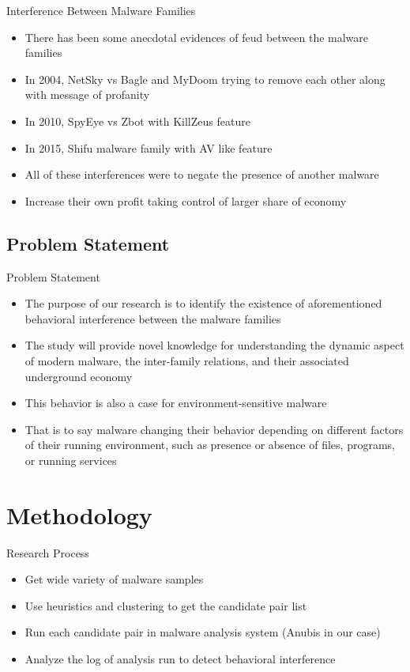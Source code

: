 \documentclass[]{beamer}
\begin{document}
\begin{frame}[t]{Interference Between Malware Families}
  \begin{itemize}
    \item There has been some anecdotal evidences of feud between the malware families
    \item In 2004, NetSky vs Bagle and MyDoom trying to remove each other along with message of profanity
    \item In 2010, SpyEye vs Zbot with KillZeus feature
    \item In 2015, Shifu malware family with AV like feature
    \item All of these interferences were to negate the presence of another malware
    \item Increase their own profit taking control of larger share of economy
  \end{itemize}
\end{frame}
\subsection{Problem Statement}
\label{sub:Problem Statement}
\begin{frame}[t]{Problem Statement}
\begin{itemize}
  \item The purpose of our research is to identify the existence of aforementioned behavioral interference between the malware families
  \item The study will provide novel knowledge for understanding the dynamic aspect of modern malware, the inter-family relations, and their associated underground economy
  \item This behavior is also a case for environment-sensitive malware
  \item That is to say malware changing their behavior depending on different factors of their running environment, such as presence or absence of files, programs, or running services
\end{itemize}
\end{frame}

\section{Methodology}
\label{sec:Methodology}
\begin{frame}[t]{Research Process}
\begin{itemize}
\item Get wide variety of malware samples
\item Use heuristics and clustering to get the candidate pair list
\item Run each candidate pair in malware analysis system (Anubis in our case)
\item Analyze the log of analysis run to detect behavioral interference
\end{itemize}
\begin{figure}[h]
    \centering
    \def\svgwidth{\columnwidth}
    \scalebox{0.5}{}
\end{figure}
\end{frame}
\end{document}
